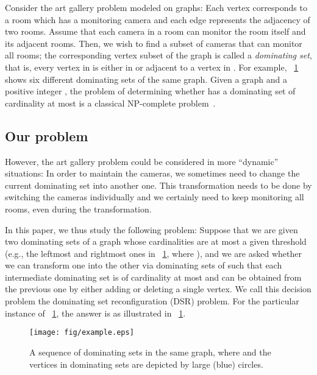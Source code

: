 \documentclass{llncs}
\begin{document}
Consider the art gallery problem modeled on graphs:
Each vertex corresponds to a room which has a monitoring camera
and each edge represents the adjacency of two rooms.
Assume that each camera in a room can monitor the room itself and its adjacent rooms.
Then, we wish to find a subset of cameras that can monitor all rooms;
the corresponding vertex subset  of the graph  is called a {\em dominating set},
that is, every vertex in  is either in  or adjacent to a vertex in .
For example, \figurename~\ref{fig:example} shows six different dominating sets of the same graph.
Given a graph  and a positive integer , the problem of determining
whether  has a dominating set of cardinality at most
 is a classical NP-complete problem~\cite{GJ79}.

\subsection{Our problem}

However, the art gallery problem could be considered in more ``dynamic'' situations:
In order to maintain the cameras, we sometimes need to change the current dominating set into another one.
This transformation needs to be done by switching the cameras individually and we certainly need to
keep monitoring all rooms, even during the transformation.

In this paper, we thus study the following problem:
Suppose that we are given two dominating sets of a graph  whose cardinalities are at most
a given threshold  (e.g., the leftmost and rightmost ones in \figurename~\ref{fig:example}, where ), and
we are asked whether we can transform one into the other via dominating sets of  such that each
intermediate dominating set is of cardinality at most  and can be obtained from the
previous one by either adding or deleting a single vertex.
We call this decision problem the {\sc dominating set reconfiguration (DSR)} problem.
For the particular instance of \figurename~\ref{fig:example}, the answer is  as illustrated in \figurename~\ref{fig:example}.

\begin{figure}[t]
\centering
	\texttt{[image: fig/example.eps]}
	\vspace{-1em}
	\caption{A sequence  of dominating sets in the
    same graph, where  and the vertices in dominating sets are depicted by large (blue) circles.}
	\vspace{-1em}
	\label{fig:example}
\end{figure}
	
\end{document}
